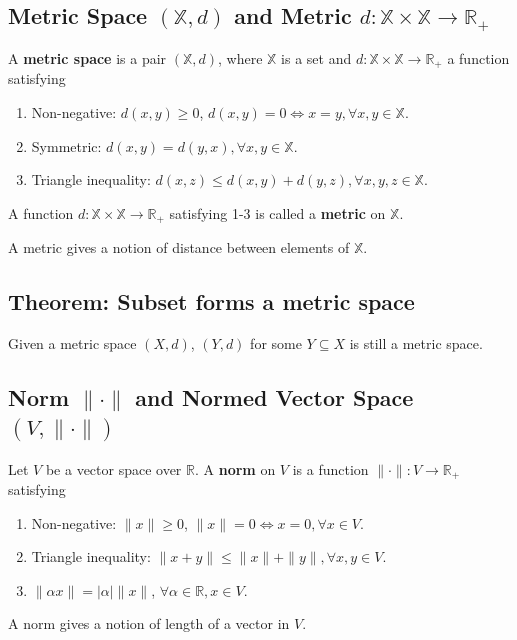 \documentclass[11pt]{elegantbook}
\begin{document}
\subsection{Metric Space $(\mathbb{X}, d)$ and Metric $d : \mathbb{X} \times \mathbb{X} \rightarrow \mathbb{R}_+$}
\begin{definition}
\normalfont
    A \textbf{metric space} is a pair $(\mathbb{X}, d)$, where $\mathbb{X}$ is a set and $d : \mathbb{X} \times \mathbb{X} \rightarrow \mathbb{R}_+$ a function satisfying
    \begin{enumerate}
        \item Non-negative: $d(x,y)\geq 0$, $d(x,y)=0\Leftrightarrow x=y, \forall x,y\in \mathbb{X}$.
        \item Symmetric: $d(x,y)=d(y,x), \forall x,y\in \mathbb{X}$.
        \item Triangle inequality: $d(x,z)\leq d(x,y)+d(y,z), \forall x,y,z\in \mathbb{X}$.
    \end{enumerate}
    A function $d : \mathbb{X} \times \mathbb{X} \rightarrow \mathbb{R}_+$ satisfying 1-3 is called a \textbf{metric} on $\mathbb{X}$.
\end{definition}
A metric gives a notion of distance between elements of $\mathbb{X}$.

\subsection{Theorem: Subset forms a metric space}
\begin{theorem}
    Given a metric space $(X, d)$, $(Y, d)$ for some $Y \subseteq X$ is still a metric space.
\end{theorem}

\subsection{Norm $\|\cdot\|$ and Normed Vector Space $(V,\|\cdot\|)$}
\begin{definition}[Norm]
\normalfont
    Let $V$ be a vector space over $\mathbb{R}$. A \textbf{norm} on $V$ is a function $\|\cdot\| : V \rightarrow \mathbb{R}_+$ satisfying
    \begin{enumerate}
        \item Non-negative: $\|x\|\geq 0$, $\|x\|=0\Leftrightarrow x=0, \forall x\in V$.
        \item Triangle inequality: $\|x+y\|\leq \|x\|+\|y\|, \forall x,y\in V$.
        \item $\|\alpha x\|=|\alpha|\|x\|$, $\forall \alpha\in \mathbb{R},x\in V$.
    \end{enumerate}
\end{definition}
A norm gives a notion of length of a vector in $V$.
\end{document}
